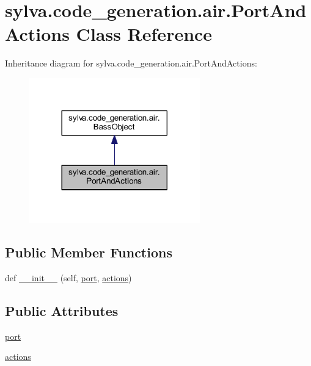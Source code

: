 \hypertarget{classsylva_1_1code__generation_1_1air_1_1_port_and_actions}{}\section{sylva.\+code\+\_\+generation.\+air.\+Port\+And\+Actions Class Reference}
\label{classsylva_1_1code__generation_1_1air_1_1_port_and_actions}


Inheritance diagram for sylva.\+code\+\_\+generation.\+air.\+Port\+And\+Actions\+:\nopagebreak
\begin{figure}[H]
\begin{center}
\leavevmode
\includegraphics[width=209pt]{classsylva_1_1code__generation_1_1air_1_1_port_and_actions__inherit__graph}
\end{center}
\end{figure}
\subsection*{Public Member Functions}
\begin{DoxyCompactItemize}
\item 
def \hyperlink{classsylva_1_1code__generation_1_1air_1_1_port_and_actions_a099f5352bd153f64b013fe50a8358308}{\+\_\+\+\_\+init\+\_\+\+\_\+} (self, \hyperlink{classsylva_1_1code__generation_1_1air_1_1_port_and_actions_a6b5a21780c1b3cc8879c05a5dfdd65bf}{port}, \hyperlink{classsylva_1_1code__generation_1_1air_1_1_port_and_actions_aaeb765c205fcb8c38025428542025ba7}{actions})
\end{DoxyCompactItemize}
\subsection*{Public Attributes}
\begin{DoxyCompactItemize}
\item 
\hyperlink{classsylva_1_1code__generation_1_1air_1_1_port_and_actions_a6b5a21780c1b3cc8879c05a5dfdd65bf}{port}
\item 
\hyperlink{classsylva_1_1code__generation_1_1air_1_1_port_and_actions_aaeb765c205fcb8c38025428542025ba7}{actions}
\end{DoxyCompactItemize}


